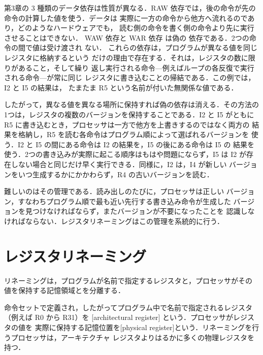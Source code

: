 \documentclass[../main.tex]{subfiles}
\begin{document}
第3章の 3 種類のデータ依存は性質が異なる．RAW 依存では，後の命令が先の命令の計算した値を使う．データは
実際に一方の命令から他方へ流れるのであり，どのようなハードウェアでも，
読む側の命令を書く側の命令より先に実行させることはできない．%
WAW 依存と WAR 依存%
は偽の
依存である．2つの命令の間で値は受け渡され
ない．%
これらの依存は，プログラムが異なる値を同じ
レジスタに格納するという
だけの理由で存在する．それは，レジスタの数に限りがあること，そして繰り
返し実行される命令---例えばループの各反復で実行される命令---が常に同じ
レジスタに書き込むことの帰結である．この例では，I2 と I5 の結果は，
たまたま R5 という名前が付いた無関係な値である．

したがって，異なる値を異なる場所に保持すれば偽の依存は消える．その方法の
1つは，レジスタの複数のバージョンを保持することである．I2 と I5 がともに
R5 に書き込むとき，プロセッサは一方で他方を上書きするのではなく両方の
結果を格納し，R5 を読む各命令はプログラム順によって選ばれるバージョンを
使う．I2 と I5 の間にある命令は I2 の結果を，I5 の後にある命令は I5 の
結果を使う．2つの書き込みが実際に起こる順序はもはや問題にならず，I5 は
I2 が存在しない場合と同じだけ早く実行できる．同様に，I2 は，I4 が新しい
バージョンをいつ生成するかにかかわらず，R4 の古いバージョンを読む．

難しいのはその管理である．読み出しのたびに，プロセッサは正しい
バージョン，すなわちプログラム順で最も近い先行する書き込み命令が生成した
バージョンを見つけなければならず，またバージョンが不要になったことを
認識しなければならない．レジスタリネーミングはこの管理を系統的に行う．

\section{レジスタリネーミング}
\label{sec:l06-renaming}

リネーミングは，プログラムが名前で指定するレジスタと，プロセッサがその
値を保持する記憶領域とを分離する．

\begin{definition}[アーキテクチャレジスタと物理レジスタ]
  \label{def:l06-registers}
  命令セットで定義され，したがってプログラム中で名前で指定されるレジスタ
  （例えば R0 から R31）を
  [architectural register]%
  という．プロセッサがレジスタの値を
  実際に保持する記憶位置を[physical
  register]という．リネーミングを行うプロセッサは，アーキテクチャ
  レジスタよりはるかに多くの物理レジスタを持つ．
\end{definition}
\end{document}
